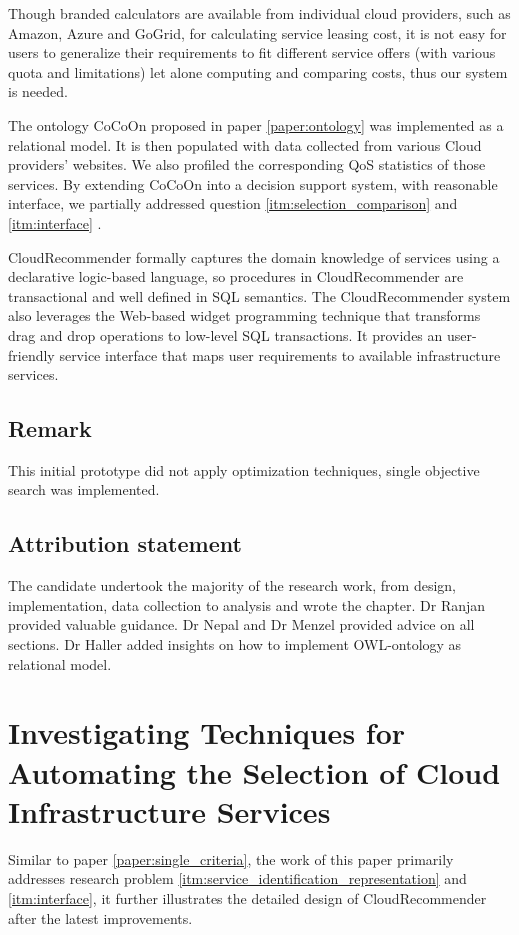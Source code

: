 Though branded calculators are available from individual cloud providers, such as Amazon, Azure and GoGrid, for calculating service leasing cost, it is not easy for users to generalize their requirements to fit different service offers (with various quota and limitations) let alone computing and comparing costs, thus our system is needed.

The ontology CoCoOn proposed in paper \ref{paper:ontology} was implemented as a relational model. It is then populated with data collected from various Cloud providers' websites. We also profiled the corresponding QoS statistics of those services. By extending CoCoOn into a decision support system, with reasonable interface, we partially addressed question \ref{itm:selection_comparison} and \ref{itm:interface} .

CloudRecommender formally captures the domain knowledge of services using a declarative logic-based language, so procedures in CloudRecommender are transactional and well defined in SQL semantics. The CloudRecommender system also leverages the Web-based widget programming technique that transforms drag and drop operations to low-level SQL transactions. It provides an user-friendly service interface that maps user requirements to available infrastructure services.

\subsection{Remark}
This initial prototype did not apply optimization techniques, single objective search was implemented.

\subsection{Attribution statement}
The candidate undertook the majority of the research work, from design, implementation, data collection to analysis and wrote the chapter. 
Dr Ranjan provided valuable guidance. 
Dr Nepal and Dr Menzel provided advice on all sections.
Dr Haller added insights on how to implement OWL-ontology as relational model.

\section{Investigating Techniques for Automating the Selection of Cloud Infrastructure Services}

Similar to paper \ref{paper:single_criteria}, the work of this paper primarily addresses research problem \ref{itm:service_identification_representation} and \ref{itm:interface}, it further illustrates the detailed design of CloudRecommender after the latest improvements.


